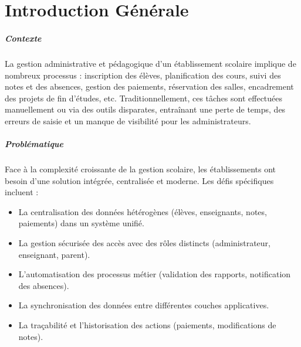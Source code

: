 \documentclass[12pt,a4paper,twoside]{report}
\begin{document}
\listoffigures
\newpage

\listoftables
\newpage

\chapter*{Introduction Générale}

\paragraph{Contexte}
La gestion administrative et pédagogique d'un établissement scolaire implique de nombreux processus : inscription des élèves, planification des cours, suivi des notes et des absences, gestion des paiements, réservation des salles, encadrement des projets de fin d'études, etc. Traditionnellement, ces tâches sont effectuées manuellement ou via des outils disparates, entraînant une perte de temps, des erreurs de saisie et un manque de visibilité pour les administrateurs.

\paragraph{Problématique}
Face à la complexité croissante de la gestion scolaire, les établissements ont besoin d'une solution intégrée, centralisée et moderne. Les défis spécifiques incluent :
\begin{itemize}[leftmargin=*]
  \item La centralisation des données hétérogènes (élèves, enseignants, notes, paiements) dans un système unifié.
  \item La gestion sécurisée des accès avec des rôles distincts (administrateur, enseignant, parent).
  \item L'automatisation des processus métier (validation des rapports, notification des absences).
  \item La synchronisation des données entre différentes couches applicatives.
  \item La traçabilité et l'historisation des actions (paiements, modifications de notes).
\end{itemize}
\end{document}
